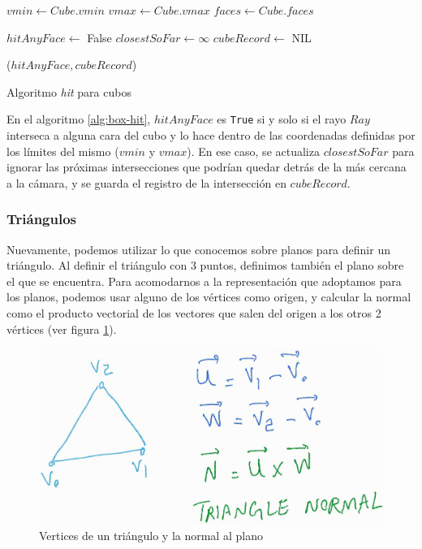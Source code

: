 \begin{algorithm}
  \begin{algorithmic}[1]
    \State $vmin \gets Cube.vmin$ 
    \State $vmax \gets Cube.vmax$
    \State $faces \gets Cube.faces$

    \State $hitAnyFace \gets$ False
    \State $closestSoFar \gets \infty$
    \State $cubeRecord \gets$ NIL

     

    \EndIf
    \EndFor

    \State \Return ($hitAnyFace, cubeRecord$)
    \EndFunction
  \end{algorithmic}
  \caption{Algoritmo \textit{hit} para cubos}
  \label{alg:box-hit}
\end{algorithm}

En el algoritmo \ref{alg:box-hit}, $hitAnyFace$ es \texttt{True} si y solo si el
rayo $Ray$ interseca a alguna cara del cubo y lo hace dentro de las coordenadas
definidas por los límites del mismo ($vmin$ y $vmax$). En ese caso, se actualiza
$closestSoFar$ para ignorar las próximas intersecciones que podrían quedar detrás
de la más cercana a la cámara, y se guarda el registro de la intersección en
$cubeRecord$.

\subsubsection{Triángulos}

Nuevamente, podemos utilizar lo que conocemos sobre planos para definir un
triángulo. Al definir el triángulo con 3 puntos, definimos también el plano sobre
el que se encuentra. Para acomodarnos a la representación que adoptamos para los
planos, podemos usar alguno de los vértices como origen, y calcular la normal
como el producto vectorial de los vectores que salen del origen a los otros 2
vértices (ver figura \ref{fig:triangle-normal}).

\begin{figure}
    \centering
    \includegraphics[width=.7\textwidth]{imgs/triangle-normal.jpg}
    \caption{Vertices de un triángulo y la normal al plano}
    \label{fig:triangle-normal}
\end{figure}

